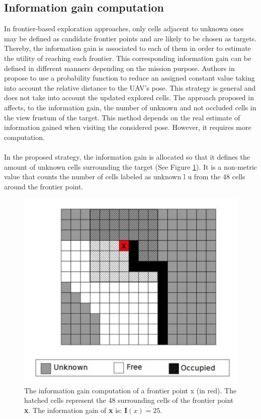 \documentclass[11pt,openany]{book}
\begin{document}
\subsection{Information gain computation}
In frontier-based exploration approaches, only cells adjacent to unknown ones may be deﬁned as candidate frontier points and are likely to be chosen as targets. Thereby, the information gain is associated to each of them in order to estimate the utility of reaching each frontier. This corresponding information gain can be deﬁned in diﬀerent manners depending on the mission purpose. Authors in \cite{burgard2005coordinated} propose to use a probability function to reduce an assigned constant value taking into account the relative distance to the UAV’s pose. This strategy is general and does not take into account the updated explored cells. The approach proposed in \cite{heng2015efficient} aﬀects, to the information gain, the number of unknown and not occluded cells in the view frustum of the target. This method depends on the real estimate of information gained when visiting the considered pose. However, it requires more computation.\\\\
In the proposed strategy, the information gain is allocated so that it deﬁnes the amount of unknown cells surrounding the target (See Figure \ref{fig:3.4}). It is a non-metric value that counts the number of cells labeled as unknown l u from the 48 cells around the frontier point.
\begin{figure}[H]
    \centering
    \includegraphics[scale=0.4]{assets/3_4.png}
    \caption{The information gain computation of a frontier point x (in red). The hatched cells represent the 48 surrounding cells of the frontier point \textbf{x}. The information gain of \textbf{x} is: $\mathbf{I}(x)=25$.}
    \label{fig:3.4}
\end{figure}
\end{document}
